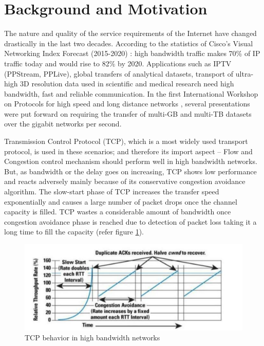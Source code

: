 
\section{Background and Motivation}
The nature and quality of the service requirements of the Internet have changed drastically in the last two decades. According to the statistics of Cisco's Visual Networking Index Forecast (2015-2020) \cite{winCisco}: high bandwidth traffic makes 70\% of IP traffic today and would rise to 82\% by 2020. Applications such as IPTV (PPStream, PPLive), global transfers of analytical datasets, transport of ultra-high 3D resolution data used in scientific and medical research need high bandwidth, fast and reliable communication. In the first International Workshop on Protocols for high speed and long distance networks \cite{winfirst}, several presentations were put forward on requiring the transfer of multi-GB and multi-TB datasets over the gigabit networks per second. 

Transmission Control Protocol (TCP), which is a most widely used transport protocol, is used in these scenarios; and therefore its import aspect -- Flow and Congestion control mechanism should perform well in high bandwidth networks. But, as bandwidth or the delay goes on increasing, TCP shows low performance and reacts adversely mainly because of its conservative congestion avoidance algorithm. The slow-start phase of TCP increases the transfer speed exponentially and causes a large number of packet drops once the channel capacity is filled. TCP wastes a considerable amount of bandwidth once congestion avoidance phase is reached due to detection of packet loss taking it a long time to fill the capacity (refer figure \ref{tcp}).

\begin{figure}[htbp]
\label{tcp}
\begin{center}
\includegraphics[width=5.5in]{Figures/img11}
\caption{TCP behavior in high bandwidth networks \cite{ipj}}
\end{center}
\end{figure}

